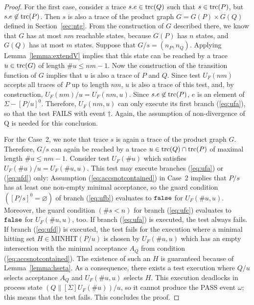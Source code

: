 \begin{proof}
For the first case, consider a  trace $s.e\in\text{trc}(Q)$ such that $s\in\text{trc}(P)$, but 
$s.e\not\in\text{trc}(P)$. Then $s$ is also a trace of the product graph $G = G(P)\times G(Q)$ defined in Section~\ref{sec:ntg}. From the construction of $G$ described there, we know that $G$ has at most $nm$ reachable states, because $G(P)$ has $n$ states, and $G(Q)$ has at most $m$ states. Suppose that $G/s = (n_P,n_Q)$. Applying Lemma~\ref{lemma:extendV} implies that this state can be reached by a trace $u\in\text{trc}(G)$ of length $\#u\le nm-1$. Now the construction of the transition function of $G$ implies that $u$ is also a trace of $P$ and $Q$. Since test $U_F(nm)$ accepts all traces of $P$ up to length $nm$, $u$ is also a trace of this test, and, by construction, $U_F(nm)/u = U_F(nm,u)$. Since $s.e\not\in\text{trc}(P)$,
$e$ is an element of $\Sigma-[P/u]^0$. Therefore, $U_F(nm,u)$ can only execute its first branch (\ref{eq:ufa}), so that the test FAILS with event $\dag$. Again, the assumption of non-divergence of Q is needed for this conclusion.

For the Case~2, we note that trace $s$ is again a trace of the product graph $G$. Therefore, $G/s$ can again be reached by a trace $u\in\text{trc}(Q)\cap\text{trc}(P)$ of maximal length
$\#u\le nm-1$. Consider test $U_F(\# u)$ which satisfies $U_F(\# u)/u = U_F(\#u,u)$. This
test may execute branches (\ref{eq:ufa}) or (\ref{eq:ufd}) only: 
Assumption (\ref{eq:accsnotcontained}) in Case~2 implies that $P/s$ has at least one non-empty minimal acceptance, so the guard condition $([P/s]^0 = \varnothing)$ of branch
 (\ref{eq:ufb}) evaluates to $\mbox{{\tt false}}$ for $U_F(\#u,u)$. Moreover, 
 the guard condition $(\#s < n)$
for branch (\ref{eq:ufc}) evaluates to $\mbox{{\tt false}}$ for $U_F(\#u,u)$, too. 
If branch (\ref{eq:ufa}) is executed, the test always fails. If branch (\ref{eq:ufd})
is executed, the test fails for the execution where a minimal hitting set 
$H\in\text{MINHIT}(P/u)$ is chosen by $U_F(\#u,u)$ which has an empty intersection
with the minimal acceptance $A_Q$ from condition (\ref{eq:accsnotcontained}). The existence of such an $H$ is guaranteed because of Lemma~\ref{lemma:hseta}. As a consequence, there exists 
a test execution   where $Q/u$ selects acceptance $A_Q$ and  $U_F(\#u,u)$ 
selects $H$. This execution deadlocks in 
process state $(Q\parallel[\Sigma]U_F(\# u))/u$, so it cannot 
produce the PASS event $\omega$; this  means that the test fails. This concludes the proof.
\xbox
\end{proof}


















